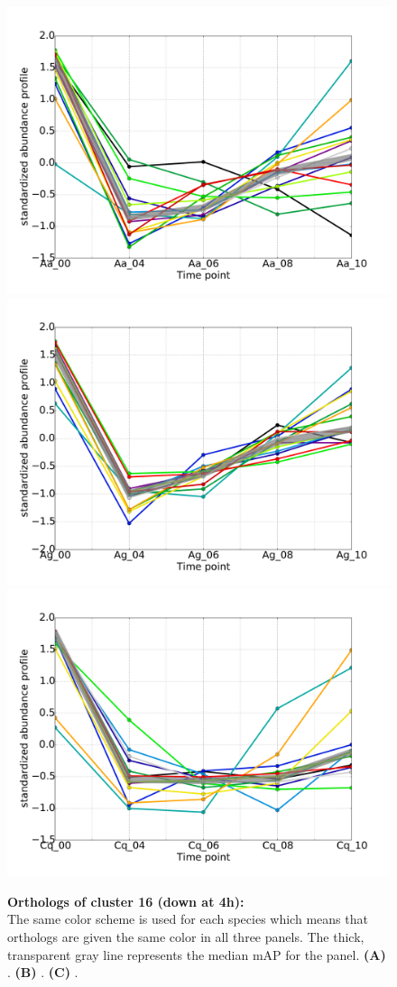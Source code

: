\begin{figure}[p]
% 
\subcaptionbox{\label{fig:cluster16-Aa}}
{\includegraphics[width=.5\linewidth]{figures/figs/ecr_and_insects_ptci_20130918_orthodb7/downAt4_gene_profiles_from_cummerbund/Aa_downAt4_cls16_Ag_target_FPKMs_vb_orthos.pdf}}
%
\subcaptionbox{\label{fig:cluster16-Ag}}
{\includegraphics[width=.5\linewidth]{figures/figs/ecr_and_insects_ptci_20130918_orthodb7/downAt4_gene_profiles_from_cummerbund/Ag_downAt4_cls16_Ag_target_FPKMs_vb_orthos.pdf}}
%
\subcaptionbox{\label{fig:cluster16-Cq}}
{\includegraphics[width=.5\linewidth]{figures/figs/ecr_and_insects_ptci_20130918_orthodb7/downAt4_gene_profiles_from_cummerbund/Cq_downAt4_cls16_Ag_target_FPKMs_vb_orthos.pdf}}
% 
\caption[Orthologs of cluster 16]{\sf \textbf{Orthologs of cluster 16 (down at 4h):}\\
The same color scheme is used for each species which means that orthologs are given the same color in all three panels.
The thick, transparent gray line represents the median \gls{mAP} for the panel.
\textbf{(A)} \Aa.
\textbf{(B)} \Ag.
\textbf{(C)} \Cq.
}\label{fig:cluster16}
\end{figure}